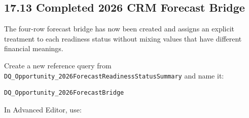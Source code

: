 \documentclass[11pt,a4paper]{article}
\begin{document}
\subsection{17.13 Completed 2026 CRM Forecast Bridge}

The four-row forecast bridge has now been created and assigns an explicit
treatment to each readiness status without mixing values that have different
financial meanings.

Create a new reference query from
\texttt{DQ\_Opportunity\_2026ForecastReadinessStatusSummary} and name it:

\begin{lstlisting}[style=powerquery]
DQ_Opportunity_2026ForecastBridge
\end{lstlisting}

In Advanced Editor, use:
\end{document}
